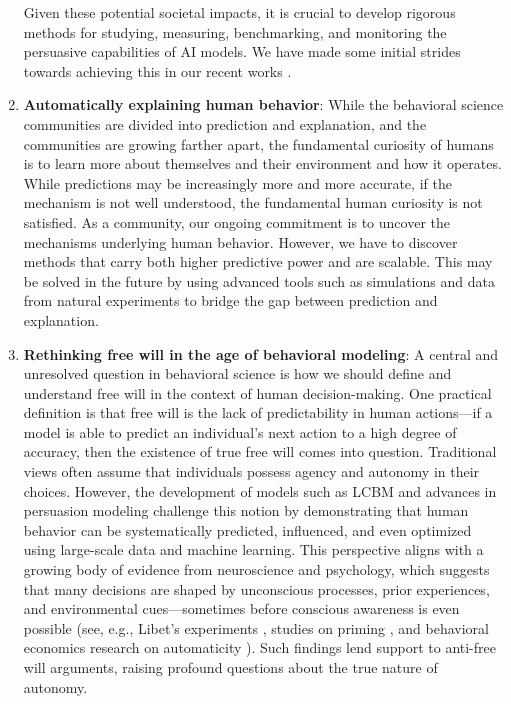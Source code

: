 \begin{enumerate}
    Given these potential societal impacts, it is crucial to develop rigorous methods for studying, measuring, benchmarking, and monitoring the persuasive capabilities of AI models. We have made some initial strides towards achieving this in our recent works \cite{singh2024measuring,khurana2023behavior}.


    \item \textbf{Automatically explaining human behavior}: While the behavioral science communities are divided into prediction and explanation, and the communities are growing farther apart, the fundamental curiosity of humans is to learn more about themselves and their environment and how it operates. While predictions may be increasingly more and more accurate, if the mechanism is not well understood, the fundamental human curiosity is not satisfied. As a community, our ongoing commitment is to uncover the mechanisms underlying human behavior. However, we have to discover methods that carry both higher predictive power and are scalable. This may be solved in the future by using advanced tools such as simulations and data from natural experiments to bridge the gap between prediction and explanation.


         \item \textbf{Rethinking free will in the age of behavioral modeling}: A central and unresolved question in behavioral science is how we should define and understand free will in the context of human decision-making. One practical definition is that free will is the lack of predictability in human actions—if a model is able to predict an individual's next action to a high degree of accuracy, then the existence of true free will comes into question. Traditional views often assume that individuals possess agency and autonomy in their choices. However, the development of models such as LCBM \cite{khandelwal2023large} and advances in persuasion modeling \cite{singh2024measuring,khurana2023behavior} challenge this notion by demonstrating that human behavior can be systematically predicted, influenced, and even optimized using large-scale data and machine learning. This perspective aligns with a growing body of evidence from neuroscience and psychology, which suggests that many decisions are shaped by unconscious processes, prior experiences, and environmental cues—sometimes before conscious awareness is even possible (see, e.g., Libet's experiments \cite{libet1985unconscious,libet1993time}, studies on priming \cite{bargh1996automaticity}, and behavioral economics research on automaticity \cite{tversky1985framing,ariely2003coherent,johnson2003defaults}). Such findings lend support to anti-free will arguments, raising profound questions about the true nature of autonomy.



\end{enumerate}
